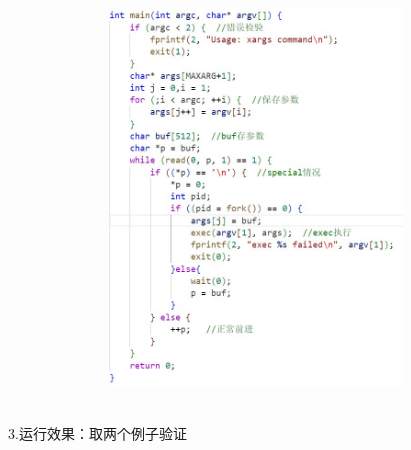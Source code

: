 \documentclass[12pt]{article}
\begin{document}
\begin{figure}[h]
    \centering
    \includegraphics[height=10cm,width=11cm]{lab0-11.jpg}
\end{figure}\\
3.运行效果：取两个例子验证
\begin{figure}[!h]
    \centering
    \hfill
\end{figure}
\end{document}
